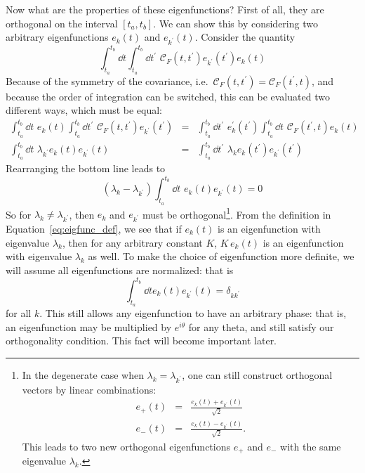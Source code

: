 Now what are the properties of these eigenfunctions?  First of all, they
are orthogonal on the interval $[t_a, t_b]$.
We can show this by considering two arbitrary eigenfunctions
$e_k(t)$ and $e_{k^\prime}(t)$.  Consider the quantity
\begin{equation}
  \int_{t_a}^{t_b} \dd t \int_{t_a}^{t_b} \dd t^\prime\,\, \mathcal{C}_F(t, t^\prime)
  e_{k^\prime}(t^\prime) e_k(t)
\end{equation}
Because of the symmetry of the covariance,
i.e.~$\mathcal{C}_F(t, t^\prime) = \mathcal{C}_F(t^\prime, t)$, and
because the order of integration can be switched, this can be evaluated
two different ways, which must be equal:
\begin{eqnarray}
  \int_{t_a}^{t_b} \dd t\,\, e_k(t)
  \int_{t_a}^{t_b} \dd t^\prime\,\, \mathcal{C}_F(t, t^\prime) e_{k^\prime}(t^\prime) &=&
  \int_{t_a}^{t_b} \dd t^\prime\,\, e_k^\prime(t^\prime)
  \int_{t_a}^{t_b} \dd t\,\, \mathcal{C}_F(t^\prime, t) e_{k}(t)
  \nonumber\\
  \int_{t_a}^{t_b} \dd t\,\, \lambda_{k^\prime} e_k(t) e_{k^\prime}(t) &=&
  \int_{t_a}^{t_b} \dd t^\prime\,\, \lambda_k e_k(t^\prime) e_{k^\prime}(t^\prime)
\end{eqnarray}
Rearranging the bottom line leads to
\begin{equation}
  (\lambda_k - \lambda_{k^\prime})
  \int_{t_a}^{t_b} \dd t\,\, e_k(t) e_{k^\prime}(t) = 0
\end{equation}
So for $\lambda_k \ne \lambda_{k^\prime}$, then $e_k$ and $e_{k^\prime}$
must be orthogonal\footnote{In the degenerate case when
$\lambda_k = \lambda_{k^\prime}$, one can still construct orthogonal
vectors by linear combinations:
\begin{eqnarray}
  e_+(t) &=& \frac{e_k(t) + e_{k^\prime}(t)}{\sqrt{2}} \nonumber\\
  e_-(t) &=& \frac{e_k(t) - e_{k^\prime}(t)}{\sqrt{2}}. \nonumber
\end{eqnarray}
This leads to two new orthogonal eigenfunctions $e_+$ and $e_-$ with the
same eigenvalue $\lambda_k$.}.  From the definition in
Equation~\ref{eq:eigfunc_def}, we see that if $e_k(t)$ is an eigenfunction
with eigenvalue $\lambda_k$,
then for any arbitrary constant $K$,
$K\, e_k(t)$ is an eigenfunction with eigenvalue $\lambda_k$ as well.
To make the choice of eigenfunction more definite, we will assume all
eigenfunctions are normalized: that is
\begin{equation}
  \int_{t_a}^{t_b} \dd t e_k(t) e_{k^\prime}(t) = \delta_{kk^\prime}
\end{equation}
for all $k$.  This still allows any eigenfunction to have an arbitrary
phase: that is, an eigenfunction may be multiplied by $e^{i\theta}$ for
any theta, and still satisfy our orthogonality condition.  This fact
will become important later.

